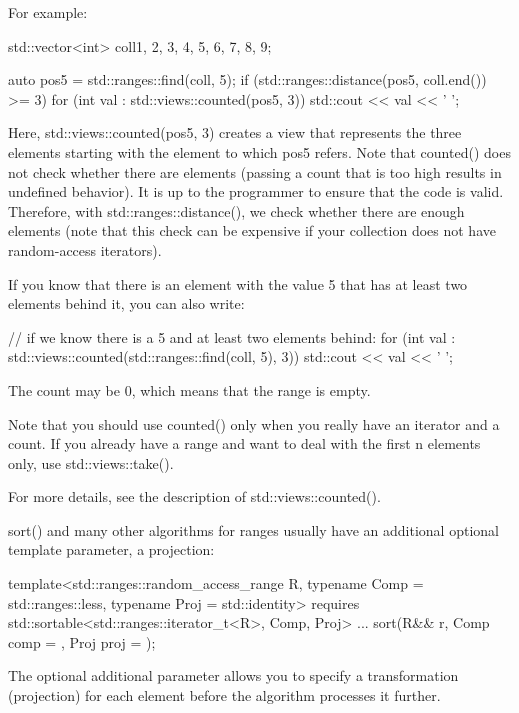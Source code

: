 For example:

\begin{cpp}
std::vector<int> coll{1, 2, 3, 4, 5, 6, 7, 8, 9};

auto pos5 = std::ranges::find(coll, 5);
if (std::ranges::distance(pos5, coll.end()) >= 3) {
	for (int val : std::views::counted(pos5, 3)) {
		std::cout << val << ' ';
	}
}
\end{cpp}

Here, std::views::counted(pos5, 3) creates a view that represents the three elements starting with the element to which pos5 refers. Note that counted() does not check whether there are elements (passing a count that is too high results in undefined behavior). It is up to the programmer to ensure that the code is valid. Therefore, with std::ranges::distance(), we check whether there are enough elements (note that this check can be expensive if your collection does not have random-access iterators).

If you know that there is an element with the value 5 that has at least two elements behind it, you can also write:

\begin{cpp}
// if we know there is a 5 and at least two elements behind:
for (int val : std::views::counted(std::ranges::find(coll, 5), 3)) {
	std::cout << val << ' ';
}
\end{cpp}

The count may be 0, which means that the range is empty.

Note that you should use counted() only when you really have an iterator and a count. If you already have a range and want to deal with the first n elements only, use std::views::take().

For more details, see the description of std::views::counted().


sort() and many other algorithms for ranges usually have an additional optional template parameter, a projection:

\begin{cpp}
template<std::ranges::random_access_range R,
			typename Comp = std::ranges::less,
			typename Proj = std::identity>
requires std::sortable<std::ranges::iterator_t<R>, Comp, Proj>
... sort(R&& r, Comp comp = {}, Proj proj = {});
\end{cpp}

The optional additional parameter allows you to specify a transformation (projection) for each element before the algorithm processes it further.

